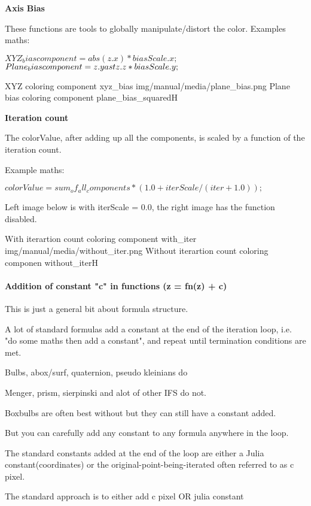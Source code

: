 \textbf{Axis Bias}

These functions are tools to globally manipulate/distort the color. 
Examples maths:

$XYZ_bias                component = abs(z.x) \ast biasScale.x;$
$Plane_bias              component = z.y \\ast z.z \ast biasScale.y;$

{XYZ coloring component}
{xyz_bias}
{img/manual/media/plane_bias.png}
{Plane bias coloring component}
{plane_bias_squared}{H}

\textbf{Iteration count}

The  colorValue, after adding up all the components, is  scaled by a function of the iteration count.

Example maths:

$colorValue =  sum_of_all_components *  ( 1.0 + iterScale / ( iter + 1.0));$

Left image below is with iterScale = 0.0, the right image has the function disabled.

{With iterartion count coloring component}
{with_iter}
{img/manual/media/without_iter.png}
{Without iterartion count coloring componen}
{without_iter}{H}


\paragraph{Addition of constant "c" in functions (z = fn(z) + c)}
This is just a general bit about formula structure.

A lot of standard formulas add a constant at the end of the iteration loop, i.e. "do some maths then add a constant", and repeat until termination conditions are met.

Bulbs, abox/surf, quaternion, pseudo kleinians do

Menger, prism, sierpinski and alot of other IFS do not.

Boxbulbs are often best without but they can still have a constant added.

But you can carefully add any constant to any formula anywhere in the loop.

The standard constants added at the end of the loop are either a Julia constant(coordinates) or the original-point-being-iterated often referred to as c pixel.

The standard approach is to either add c pixel OR julia constant

